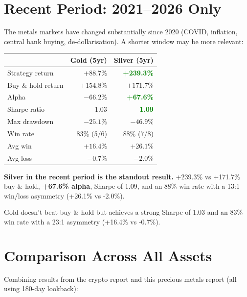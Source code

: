 \documentclass[11pt,a4paper]{article}
\begin{document}

\section{Recent Period: 2021--2026 Only}

The metals markets have changed substantially since 2020 (COVID,
inflation, central bank buying, de-dollarisation). A shorter window
may be more relevant:

\vspace{0.5em}
\begin{tabular}{@{}lrr@{}}
    \toprule
    & \textbf{Gold (5yr)} & \textbf{Silver (5yr)} \\
    \midrule
    Strategy return     & $+88.7\%$     & \textcolor{green}{\textbf{+239.3\%}} \\
    Buy \& hold return  & $+154.8\%$    & $+171.7\%$ \\
    Alpha               & $-66.2\%$     & \textcolor{green}{\textbf{+67.6\%}} \\
    Sharpe ratio        & $1.03$        & \textcolor{green}{\textbf{1.09}} \\
    Max drawdown        & $-25.1\%$     & $-46.9\%$  \\
    Win rate            & 83\% (5/6)    & 88\% (7/8) \\
    Avg win             & $+16.4\%$     & $+26.1\%$  \\
    Avg loss            & $-0.7\%$      & $-2.0\%$   \\
    \bottomrule
\end{tabular}

\vspace{0.5em}
\textbf{Silver in the recent period is the standout result.}
+239.3\% vs +171.7\% buy \& hold, \textbf{+67.6\% alpha}, Sharpe of
1.09, and an 88\% win rate with a 13:1 win/loss asymmetry
(+26.1\% vs -2.0\%).

Gold doesn't beat buy \& hold but achieves a strong Sharpe of 1.03
and an 83\% win rate with a 23:1 asymmetry (+16.4\% vs -0.7\%).


\section{Comparison Across All Assets}

Combining results from the crypto report and this precious metals
report (all using 180-day lookback):
\end{document}

